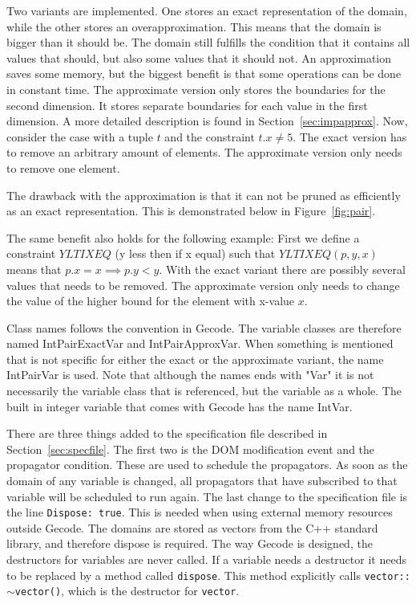 \documentclass[a4paper,11pt]{article}
\begin{document}
Two variants are implemented. One stores an exact representation of the domain, while the other stores an overapproximation. This means that the domain is bigger than it should be. The domain still fulfills the condition that it contains all values that should, but also some values that it should not. An approximation saves some memory, but the biggest benefit is that some operations can be done in constant time. The approximate version only stores the boundaries for the second dimension. It stores separate boundaries for each value in the first dimension. A more detailed description is found in Section~\ref{sec:impapprox}. Now, consider the case with a tuple $t$ and the constraint $t.x\neq5$. The exact version has to remove an arbitrary amount of elements. The approximate version only needs to remove one element. 

The drawback with the approximation is that it can not be pruned as efficiently as an exact representation. This is demonstrated below in Figure~\ref{fig:pair}.




The same benefit also holds for the following example: First we define a constraint $YLTIXEQ$ (y less then if x equal) such that $YLTIXEQ(p, y, x)$ means that $p.x=x\implies p.y<y$. With the exact variant there are possibly several values that needs to be removed. The approximate version only needs to change the value of the higher bound for the element with x-value $x$.

Class names follows the convention in Gecode. The variable classes are therefore named IntPairExactVar and IntPairApproxVar. When something is mentioned that is not specific for either the exact or the approximate variant, the name IntPairVar is used. Note that although the names ends with "Var" it is not necessarily the variable class that is referenced, but the variable as a whole. The built in integer variable that comes with Gecode has the name IntVar.

There are three things added to the specification file described in Section~\ref{sec:specfile}. The first two is the DOM modification event and the propagator condition. These are used to schedule the propagators. As soon as the domain of any variable is changed, all propagators that have subscribed to that variable will be scheduled to run again. The last change to the specification file is the line \texttt{Dispose: true}. This is needed when using external memory resources outside Gecode. The domains are stored as vectors from the C++ standard library, and therefore dispose is required. The way Gecode is designed, the destructors for variables are never called. If a variable needs a destructor it needs to be replaced by a method called \texttt{dispose}. This method explicitly calls \texttt{vector::$\sim$vector()}, which is the destructor for \texttt{vector}.
\end{document}
